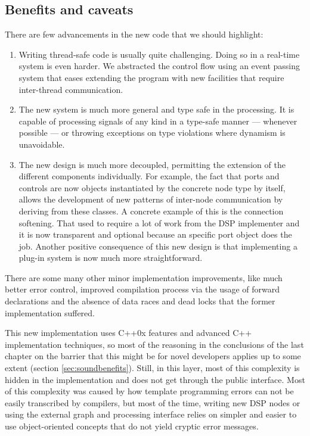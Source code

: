 \subsection{Benefits and caveats}

There are few advancements in the new code that we should highlight:
\begin{enumerate}
\item Writing thread-safe code is usually quite challenging. Doing so
  in a real-time system is even harder. We abstracted the control flow
  using an event passing system that eases extending the program with new
  facilities that require inter-thread communication.

\item The new system is much more general and type safe in the
  processing. It is capable of processing signals of any kind in a
  type-safe manner --- whenever possible --- or throwing exceptions on
  type violations where dynamism is unavoidable.

\item The new design is much more decoupled, permitting the extension
  of the different components individually. For example, the fact that
  ports and controls are now objects instantiated by the concrete node
  type by itself, allows the development of new patterns of inter-node
  communication by deriving from these classes. A concrete example of
  this is the connection softening. That used to require a lot of work
  from the DSP implementer and it is now transparent and optional because
  an specific port object does the job. Another positive consequence
  of this new design is that implementing a plug-in system is now much
  more straightforward.
\end{enumerate}

There are some many other minor implementation improvements, like much
better error control, improved compilation process via the usage of
forward declarations and the absence of data races and dead locks that
the former implementation suffered.

This new implementation uses C++0x features and advanced C++
implementation techniques, so most of the reasoning in the conclusions
of the last chapter on the barrier that this might be for novel
developers applies up to some extent (section
\ref{sec:soundbenefits}). Still, in this layer, most of this
complexity is hidden in the implementation and does not get through
the public interface. Most of this complexity was caused by how
template programming errors can not be easily transcribed by
compilers, but most of the time, writing new DSP nodes or using the
external graph and processing interface relies on simpler and easier
to use object-oriented concepts that do not yield cryptic error
messages.

